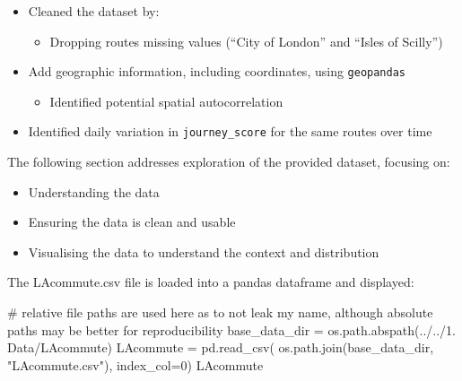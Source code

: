\documentclass[
  number]{elsarticle}
\newenvironment{Shaded}{\begin{snugshade}}{\end{snugshade}}
\newcommand{\CommentTok}[1]{\textcolor[rgb]{0.37,0.37,0.37}{#1}}
\newcommand{\DecValTok}[1]{\textcolor[rgb]{0.68,0.00,0.00}{#1}}
\newcommand{\NormalTok}[1]{\textcolor[rgb]{0.00,0.23,0.31}{#1}}
\newcommand{\OperatorTok}[1]{\textcolor[rgb]{0.37,0.37,0.37}{#1}}
\newcommand{\StringTok}[1]{\textcolor[rgb]{0.13,0.47,0.30}{#1}}
\providecommand{\tightlist}{%
  \setlength{\itemsep}{0pt}\setlength{\parskip}{0pt}}
\begin{document}
\begin{tcolorbox}[enhanced jigsaw, colframe=quarto-callout-tip-color-frame, opacityback=0, breakable, toptitle=1mm, titlerule=0mm, coltitle=black, colback=white, bottomtitle=1mm, left=2mm, arc=.35mm, leftrule=.75mm, opacitybacktitle=0.6, bottomrule=.15mm, colbacktitle=quarto-callout-tip-color!10!white, title=\textcolor{quarto-callout-tip-color}{\faLightbulb}\hspace{0.5em}{Section Summary}, rightrule=.15mm, toprule=.15mm]

\begin{itemize}
\item
  Cleaned the dataset by:

  \begin{itemize}
  \tightlist
  \item
    Dropping routes missing values (``City of London'' and ``Isles of
    Scilly'')
  \end{itemize}
\item
  Add geographic information, including coordinates, using
  \texttt{geopandas}

  \begin{itemize}
  \tightlist
  \item
    Identified potential spatial autocorrelation
  \end{itemize}
\item
  Identified daily variation in
  \texttt{\textquotesingle{}journey\_score\textquotesingle{}} for the
  same routes over time
\end{itemize}

\end{tcolorbox}

The following section addresses exploration of the provided dataset,
focusing on:

\begin{itemize}
\tightlist
\item
  Understanding the data
\item
  Ensuring the data is clean and usable
\item
  Visualising the data to understand the context and distribution
\end{itemize}

The LAcommute.csv file is loaded into a pandas dataframe and displayed:

\begin{Shaded}
\begin{Highlighting}[]
\CommentTok{\# relative file paths are used here as to not leak my name, although absolute paths may be better for reproducibility}
\NormalTok{base\_data\_dir }\OperatorTok{=}\NormalTok{ os.path.abspath(}\StringTok{\textquotesingle{}../../1. Data/LAcommute\textquotesingle{}}\NormalTok{)}
\NormalTok{LAcommute }\OperatorTok{=}\NormalTok{ pd.read\_csv(}
\NormalTok{    os.path.join(base\_data\_dir, }\StringTok{"LAcommute.csv"}\NormalTok{), index\_col}\OperatorTok{=}\DecValTok{0}\NormalTok{)}
\NormalTok{LAcommute}
\end{Highlighting}
\end{Shaded}
\end{document}
